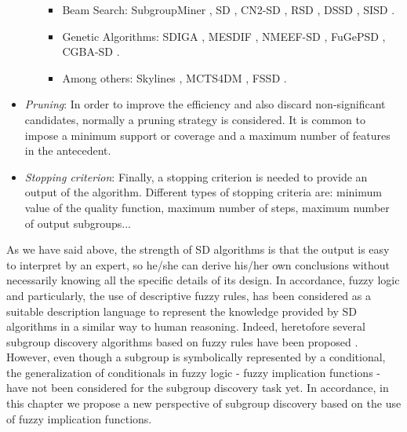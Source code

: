 \begin{itemize}
\begin{itemize}
		\begin{itemize}
		\item Beam Search: SubgroupMiner \cite{Klosgen2003}, SD \cite{Gamberger2002}, CN2-SD \cite{Lavrac2004}, RSD \cite{Jovanoski2001}, DSSD \cite{Leeuwen2012}, SISD \cite{Lijffijt2018}.
		\item Genetic Algorithms: SDIGA \cite{delJesus2007}, MESDIF \cite{Berlanga2006,delJesus2007B,Carmona2011}, NMEEF-SD \cite{Carmona2010}, FuGePSD \cite{Carmona2015}, CGBA-SD \cite{Luna2014}.
		\item Among others: Skylines \cite{Leeuwen2013}, MCTS4DM \cite{Bosc2018}, FSSD \cite{Belfodil2019}.
		\end{itemize}
	\end{itemize}
	\item \textit{Pruning}: In order to improve the efficiency and also discard non-significant candidates, normally a pruning strategy is considered. It is common to impose a minimum support or coverage and a maximum number of features in the antecedent.
	\item \textit{Stopping criterion}: Finally, a stopping criterion is needed to provide an output of the algorithm.  Different types of stopping criteria are: minimum value of the quality function, maximum number of steps, maximum number of output subgroups...
\end{itemize}

As we have said above, the strength of SD algorithms is that the output is easy to interpret by an expert, so he/she can derive his/her own conclusions without necessarily knowing all the specific details of its design. In accordance, fuzzy logic and particularly, the use of descriptive fuzzy rules, has been considered as a suitable description language to represent the knowledge provided by SD algorithms in a similar way to human reasoning. Indeed, heretofore several subgroup discovery algorithms based on fuzzy rules have been proposed \cite{Carmona2010,Carmona2011,Luna2014,Carmona2015,Berlanga2006,delJesus2007B,delJesus2007}. However, even though a subgroup is symbolically represented by a conditional, the generalization of conditionals in fuzzy logic - fuzzy implication functions - have not been considered for the subgroup discovery task yet. In accordance, in this chapter we propose a new perspective of subgroup discovery based on the use of fuzzy implication functions.

